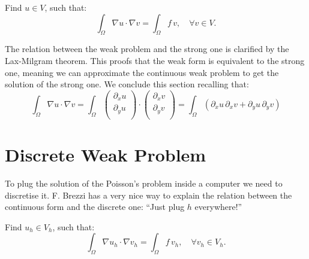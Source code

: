 \documentclass[11pt]{amsart}
\begin{document}
Find $u\in V$, such that:
\[
\int_\Omega \nabla u \cdot \nabla v = \int_\Omega f\, v, \quad \forall v \in V.
\]

The relation between the weak problem and the strong one 
is clarified by the Lax-Milgram theorem. This proofs 
that the weak form is equivalent to the strong one, meaning 
we can approximate the continuous weak problem to get the solution 
of the strong one. We conclude this section recalling that:
\[
\int_\Omega \nabla u \cdot \nabla v = \int_\Omega 
\left(
\begin{array}{c}
\partial_x u\\
\partial_y u\\
\end{array}
\right) \cdot
\left(
\begin{array}{c}
\partial_x v\\
\partial_y v\\
\end{array}
\right) = 
\int_\Omega \left(
\partial_x u\, \partial_x v + 
\partial_y u\, \partial_y v\right)
\]

\section{Discrete Weak Problem}

To plug the solution of the Poisson's problem inside a computer 
we need to discretise it. F. Brezzi has a very nice way to explain 
the relation between the continuous form and the discrete one:
``Just plug $h$ everywhere!''

Find $u_h\in V_h$, such that:
\[
\int_\Omega \nabla u_h \cdot \nabla v_h = \int_\Omega f\, v_h, \quad \forall v_h \in V_h.
\]
\end{document}
